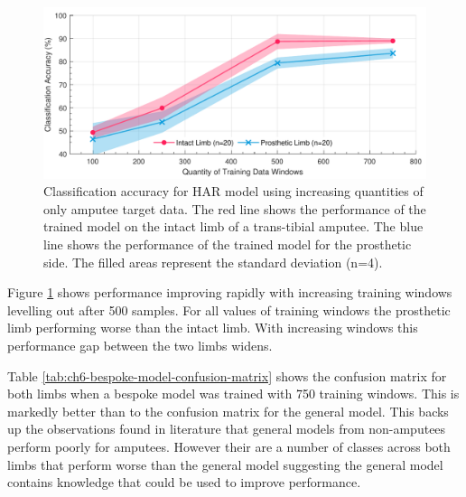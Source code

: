 \begin{figure}[!hbt]
    \centering
    \includegraphics[width=\textwidth]{content/6-Amputee/ch6_baseline_model_accuracy.pdf}
    \caption[Classification accuracy for HAR model using increasing quantities of only amputee target data]{Classification accuracy for HAR model using increasing quantities of only amputee target data. The red line shows the performance of the trained model on the intact limb of a trans-tibial amputee. The blue line shows the performance of the trained model for the prosthetic side. The filled areas represent the standard deviation  (n=4).}
    \label{fig:ch6-amputee-baseline-bespoke-model}
\end{figure}

Figure \ref{fig:ch6-amputee-baseline-bespoke-model} shows performance improving rapidly with increasing training windows levelling out after 500 samples. For all values of training windows the prosthetic limb performing worse than the intact limb. With increasing windows this performance gap between the two limbs widens.

Table \ref{tab:ch6-bespoke-model-confusion-matrix} shows the confusion matrix for both limbs when a bespoke model was trained with 750 training windows. This is markedly better than to the confusion matrix for the general model. This backs up the observations found in literature that general models from non-amputees perform poorly for amputees\cite{Lonini2016, Jamieson2021}. However their are a number of classes across both limbs that perform worse than the general model suggesting the general model contains knowledge that could be used to improve performance.

